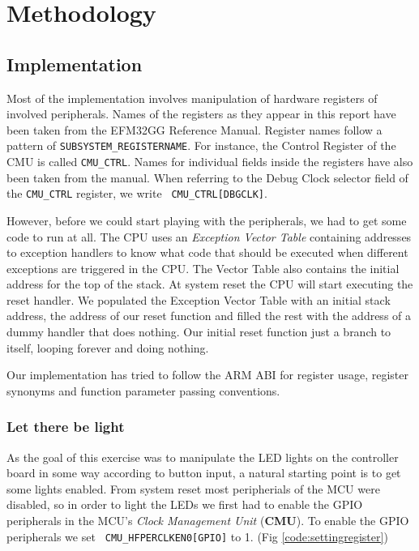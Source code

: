 \chapter{Methodology}

\section{Implementation}

Most of the implementation involves manipulation of hardware registers of
involved peripherals. Names of the registers as they appear in this report have
been taken from the EFM32GG Reference Manual. \cite{EFM32GGManual} Register names
follow a pattern of {\tt SUBSYSTEM\_REGISTERNAME}. For instance, the Control
Register of the CMU is called  {\tt CMU\_CTRL}. Names for individual fields
inside the registers have also been taken from the manual. When referring to the
Debug Clock selector field of the {\tt CMU\_CTRL} register, we write {\tt
CMU\_CTRL[DBGCLK]}.

However, before we could start playing with the peripherals, we had to get some
code to run at all. The CPU uses an \emph{Exception Vector Table} containing
addresses to exception handlers to know what code that should be executed when
different exceptions are triggered in the CPU. \cite{CortexM3Manual} The Vector
Table also contains the initial address for the top of the stack. At system
reset the CPU will start executing the reset handler. We populated the Exception
Vector Table with an initial stack address, the address of our reset function
and filled the rest with the address of a dummy handler that does nothing. Our
initial reset function just a branch to itself, looping forever and doing
nothing.

Our implementation has tried to follow the ARM ABI for register usage, register
synonyms and function parameter passing conventions. \cite{ARMArchitecture}

\subsection{Let there be light}

As the goal of this exercise was to manipulate the LED lights on the controller
board in some way according to button input, a natural starting point is to get
some lights enabled. From system reset most peripherials of the MCU were
disabled, so in order to light the LEDs we first had to enable the GPIO
peripherals in the MCU's \emph{Clock Management Unit} (\textbf{CMU}).
\cite{EFM32GGManual} To enable the GPIO peripherals we set {\tt
CMU\_HFPERCLKEN0[GPIO]} to 1. (Fig \ref{code:settingregister})

